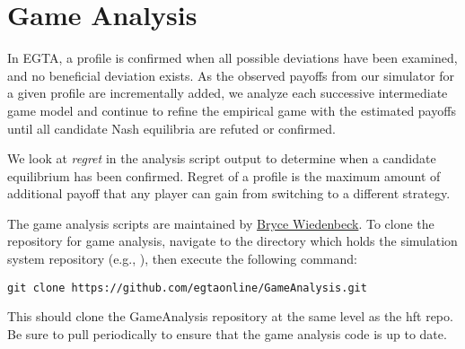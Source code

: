 \documentclass[11pt]{article}
\begin{document}
\section{Game Analysis}\label{sec:analysis}

In EGTA, a profile is confirmed when all possible deviations have been examined, and no beneficial deviation exists.
As the observed payoffs from our simulator for a given profile are incrementally added, we analyze each successive intermediate game model and continue to refine the empirical game with the estimated payoffs until all candidate Nash equilibria are refuted or confirmed.

We look at \emph{regret} in the analysis script output to determine when a candidate equilibrium has been confirmed. Regret of a profile is the maximum amount of additional payoff that any player can gain from switching to a different strategy.

The game analysis scripts are maintained by \href{mailto:btwied@umich.edu}{Bryce Wiedenbeck}. To clone the repository for game analysis, navigate to the directory which holds the simulation system repository (e.g., ), then execute the following command:
\begin{verbatim}
git clone https://github.com/egtaonline/GameAnalysis.git
\end{verbatim}
This should clone the GameAnalysis repository at the same level as the hft repo.
Be sure to pull periodically to ensure that the game analysis code is up to date.
\end{document}
